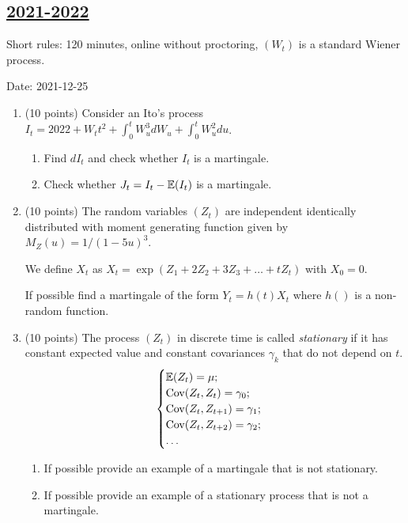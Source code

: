 \subsection[2021-2022]{\hyperref[sec:sol_kr_02_2021_2022]{2021-2022}}
\label{sec:kr_02_2021_2022} %

Short rules: 120 minutes, online without proctoring, $(W_t)$ is a standard Wiener process.

Date: 2021-12-25

\begin{enumerate}

  \item (10 points) Consider an Ito's process $I_t = 2022 + W_t t^2 + \int_0^t W_u^3 dW_u + \int_0^t W_u^2 du$.
    \begin{enumerate}
      \item Find $dI_t$ and check whether $I_t$ is a martingale. 
      \item Check whether $J_t = I_t - \operatorname{\mathbb{E}}(I_t)$ is a martingale.
    \end{enumerate}
    
  \item (10 points) The random variables $(Z_t)$ are independent identically distributed 
  with moment generating function given by $M_{Z}(u) = 1/(1 - 5u)^3$. 
  
  We define $X_t$ as $X_t = \exp(Z_1 + 2Z_2 + 3Z_3 + \ldots + tZ_t)$ with $X_0 = 0$. 
  
  If possible find a martingale of the form $Y_t = h(t) X_t$ where $h()$ is a non-random function.
  
  \item (10 points) The process $(Z_t)$ in discrete time is called \textit{stationary} if it has constant expected value 
  and constant covariances $\gamma_k$ that do not depend on $t$. 
  \[
  \begin{cases}
  \operatorname{\mathbb{E}}(Z_t) = \mu; \\
  \operatorname{Cov}(Z_t, Z_t) = \gamma_0; \\
  \operatorname{Cov}(Z_t, Z_{t+1}) = \gamma_1; \\
  \operatorname{Cov}(Z_t, Z_{t+2}) = \gamma_2; \\
  \ldots \\
  \end{cases}
  \]
  
  \begin{enumerate}
    \item If possible provide an example of a martingale that is not stationary.
    \item If possible provide an example of a stationary process that is not a martingale.
  \end{enumerate}
  

\end{enumerate}
